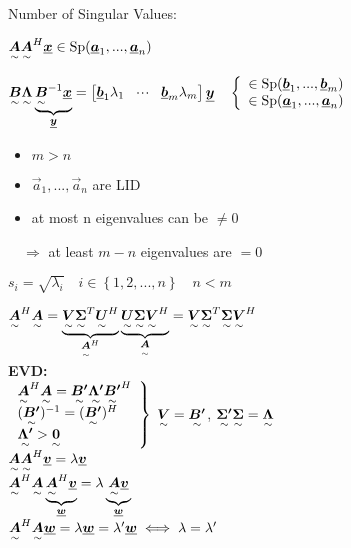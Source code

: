 Number of Singular Values:

$\ma{A}\ma{A}^H\vec{x}\in\Sp(\vec{a}_1,...,\vec{a}_n)$

$\ma{B}\ma{\Lambda}\underbrace{\ma{B}^{-1}\vec{x}}_{\vec{y}}=\mat{\vec{b}_1\lambda_1&\shdots&\vec{b}_m\lambda_m}\vec{y} \quad 
\left\lbrace \begin{array}{c} \in \Sp(\vec{b}_1,...,\vec{b}_m) \\ \in \Sp(\vec{a}_1,...,\vec{a}_n)  \end{array} \right.$
 
\begin{itemize}
\item $m>n$
\item $\vec{a}_1,...,\vec{a}_n$ are LID  \qquad
\item at most n eigenvalues can be $\neq0$
\end{itemize}
$\quad\Rightarrow$ at least $m-n$ eigenvalues are $=0$

$s_i=\sqrt{\lambda_i}\quad i\in\left\lbrace1,2,...,n\right\rbrace \quad n<m$


$\ma{A}^H\ma{A}=\underbrace{\ma{V}\ma{\Sigma}^T\ma{U}^H}_{\ma{A}^H}\underbrace{\ma{U}\ma{\Sigma}\ma{V}^H}_{\ma{A}}=\ma{V}\ma{\Sigma}^T\ma{\Sigma}\ma{V}^H$\\
\textbf{EVD:}\\
$\left. \begin{array}{l} \ma{A}^H\ma{A} = \ma{B'}\ma{\Lambda'}\ma{B'}^H\\
	(\ma{B'})^{-1} = (\ma{B'})^{H}\\
	\ma{\Lambda'} > \ma{0}\end{array} \right\rbrace$ \qquad $\ma{V} = \ma{B'}$, \quad $\ma{\Sigma'}\ma{\Sigma}=\ma{\Lambda}$\\

$\ma{A}\ma{A}^H\vec{v} = \lambda \vec{v}$\\
$\ma{A}^H\ma{A}\underbrace{\ma{A}^H\vec{v}}_{\vec{w}} = \lambda \underbrace{\ma{A}\vec{v}}_{\vec{w}}$\\
$\ma{A}^H\ma{A}\vec{w} = \lambda \vec{w} = \lambda' \vec{w} \iff \lambda = \lambda'$


